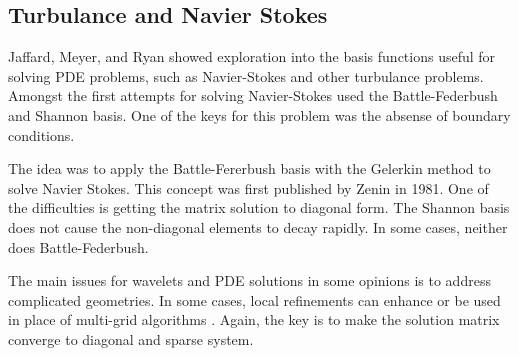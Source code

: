 


\subsection {Turbulance and Navier Stokes}
Jaffard, Meyer, and Ryan showed exploration into the basis functions useful for solving PDE problems, such as Navier-Stokes and other turbulance problems.  Amongst the first attempts for solving Navier-Stokes used the Battle-Federbush and Shannon basis.  One of the keys for this problem was the absense of boundary conditions.  

The idea was to apply the Battle-Fererbush basis with the Gelerkin method to solve Navier Stokes.  This concept was first published by Zenin in 1981.  One of the difficulties is getting the matrix solution to diagonal form.  The Shannon basis does not cause the non-diagonal elements to decay rapidly.  In some cases, neither does Battle-Federbush.  

The main issues for wavelets and PDE solutions in some opinions is to address complicated geometries.  In some cases, %
local refinements can enhance or be used in place of multi-grid algorithms%
.   Again, the key is to make the solution matrix converge to diagonal and sparse system.  


